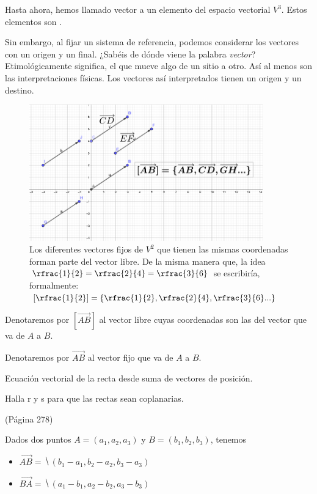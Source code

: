 Hasta ahora, hemos llamado vector a un elemento del espacio vectorial $V^3$. 
%
Estos elementos son .

Sin embargo, al fijar un sistema de referencia, podemos considerar los vectores con un origen y un final. 
%
¿Sabéis de dónde viene la palabra \textit{vector}? 
%
Etimológicamente significa, el que mueve algo de un sitio a otro. 
%
Así al menos son las interpretaciones físicas. 
%
Los vectores así interpretados tienen un origen y un destino.

\begin{figure}[hptb]
    \centering
    \includegraphics[width=0.9\textwidth]{img/Fijos-libres.png}
    \caption{Los diferentes vectores fijos de $V^2$ que tienen las mismas coordenadas forman parte del vector libre. 
    \newline
    De la misma manera que, la idea $\rfrac{1}{2}=\rfrac{2}{4}=\rfrac{3}{6}$ se escribiría, formalmente: $\left[\rfrac{1}{2}\right] = \left\{\rfrac{1}{2},\rfrac{2}{4},\rfrac{3}{6} ... \right\}$}
    \label{fig:plano}
\end{figure}


Denotaremos por $[\vec{AB}]$ al vector libre cuyas coordenadas son las del vector que va de $A$ a $B$.

Denotaremos por $\vec{AB}$ al vector fijo que va de $A$ a $B$.




Ecuación vectorial de la recta desde suma de vectores de posición. 

Halla r y s para que las rectas sean coplanarias.

\begin{defn}
(Página 278)

Dados dos puntos $A=(a_1,a_2,a_3)$ y $B = (b_1,b_2,b_3)$, tenemos 
    \begin{itemize}
        \item $\vec{AB} = \hide{(b_1-a_1, b_2-a_2, b_3-a_3)}$
        \item $\vec{BA} = \hide{(a_1-b_1, a_2-b_2, a_3-b_3)}$ 
    \end{itemize}
\end{defn}

